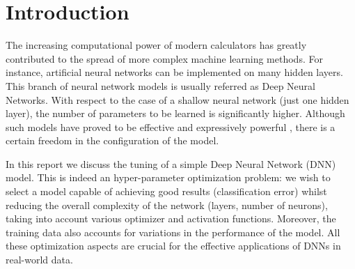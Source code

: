 \section*{Introduction}
\label{sec:intro}

The increasing computational power of modern calculators has greatly contributed to the spread of more complex machine learning methods. For instance, artificial neural networks can be implemented on many hidden layers. This branch of neural network models is usually referred as Deep Neural Networks. With respect to the case of a shallow neural network (just one hidden layer), the number of parameters to be learned is significantly higher. Although such models have proved to be effective and expressively powerful \cite{MLbook}, there is a certain freedom in the configuration of the model.

In this report we discuss the tuning of a simple Deep Neural Network (DNN) model. This is indeed an hyper-parameter optimization problem: we wish to select a model capable of achieving good results (classification error) whilst reducing the overall complexity of the network (layers, number of neurons), taking into account various optimizer and activation functions. Moreover, the training data also accounts for variations in the performance of the model. All these optimization aspects are crucial for the effective applications of DNNs in real-world data.